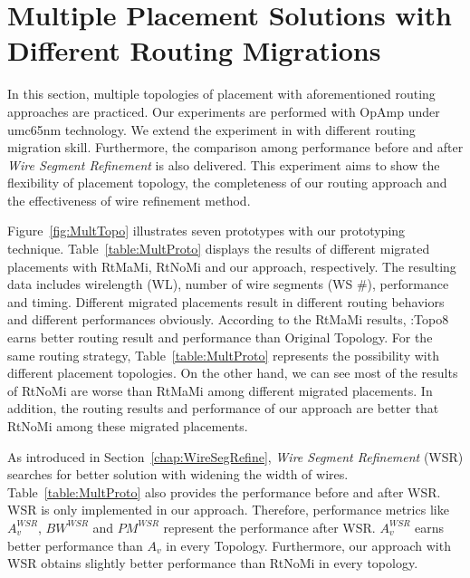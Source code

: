   \section{Multiple Placement Solutions with Different Routing Migrations}\label{sec:ExpMultiProto}

    In this section, multiple topologies of placement with aforementioned routing approaches are practiced. Our experiments are performed with OpAmp under umc65nm technology. 
    We extend the experiment in \cite{Chin_DMR_ICCAD2013} with different routing migration skill. Furthermore, the comparison among performance before and after {\it Wire Segment Refinement} is also delivered. This experiment aims to show the flexibility of placement topology, the completeness of our routing approach and the effectiveness of wire refinement method.

    Figure~\ref{fig:MultTopo} illustrates seven prototypes with our prototyping technique. Table~\ref{table:MultProto} displays the results of different migrated placements with RtMaMi, RtNoMi and our approach, respectively. The resulting data includes wirelength (WL), number of wire segments (WS \#), performance and timing. Different migrated placements result in different routing behaviors and different performances obviously. According to the RtMaMi results, \cite{ALP_YPWeng_iccad2011}:Topo8 earns better routing result and performance than Original Topology. For the same routing strategy, Table~\ref{table:MultProto} represents the possibility with different placement topologies. On the other hand, we can see most of the results of RtNoMi are worse than RtMaMi among different migrated placements. In addition, the routing results and performance of our approach are better that RtNoMi among these migrated placements. 

    As introduced in Section~\ref{chap:WireSegRefine}, {\it Wire Segment Refinement} (WSR) searches for better solution with widening the width of wires. Table~\ref{table:MultProto} also provides the performance before and after WSR. WSR is only implemented in our approach. Therefore, performance metrics like $A_v^{WSR}$, $BW^{WSR}$ and $PM^{WSR}$ represent the performance after WSR. $A_v^{WSR}$ earns better performance than $A_v$ in every Topology. Furthermore, our approach with WSR obtains slightly better performance than RtNoMi in every topology.

